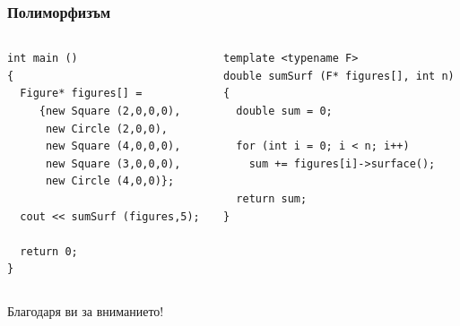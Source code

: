 \documentclass{beamer}
\begin{document}
\begin{frame}[fragile]
\frametitle{Полиморфизъм}


\begin{columns}[t]
  \begin{column}{0.5\textwidth}
\begin{flushleft}
\begin{lstlisting}
int main ()
{
  Figure* figures[] =  
     {new Square (2,0,0,0), 
      new Circle (2,0,0), 
      new Square (4,0,0,0),
      new Square (3,0,0,0),
      new Circle (4,0,0)};

  cout << sumSurf (figures,5);

  return 0;
}
\end{lstlisting}  
\end{flushleft}
  \end{column}
  \begin{column}{0.5\textwidth}


\begin{flushleft}
\begin{lstlisting}
template <typename F>
double sumSurf (F* figures[], int n)
{
  double sum = 0;
  
  for (int i = 0; i < n; i++)
    sum += figures[i]->surface();

  return sum;
}
\end{lstlisting}  
\end{flushleft}

  \end{column}
\end{columns}




\end{frame}

\begin{frame}
\centerline{Благодаря ви за вниманието!}
\end{frame}
\end{document}
